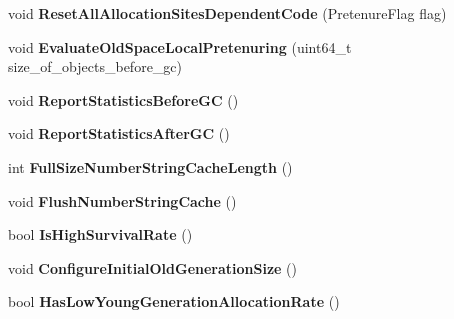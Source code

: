 \begin{DoxyCompactItemize}
\item 
void {\bfseries Reset\+All\+Allocation\+Sites\+Dependent\+Code} (Pretenure\+Flag flag)\hypertarget{classv8_1_1internal_1_1_heap_a4c888518ecaf4fd10400b80140e54769}{}\label{classv8_1_1internal_1_1_heap_a4c888518ecaf4fd10400b80140e54769}

\item 
void {\bfseries Evaluate\+Old\+Space\+Local\+Pretenuring} (uint64\+\_\+t size\+\_\+of\+\_\+objects\+\_\+before\+\_\+gc)\hypertarget{classv8_1_1internal_1_1_heap_adc9aa903226a416ab0e9512ead932b6d}{}\label{classv8_1_1internal_1_1_heap_adc9aa903226a416ab0e9512ead932b6d}

\item 
void {\bfseries Report\+Statistics\+Before\+GC} ()\hypertarget{classv8_1_1internal_1_1_heap_aea3d5c120590d25aa2029789502cb721}{}\label{classv8_1_1internal_1_1_heap_aea3d5c120590d25aa2029789502cb721}

\item 
void {\bfseries Report\+Statistics\+After\+GC} ()\hypertarget{classv8_1_1internal_1_1_heap_a58f5e3a53a3cfc6fe1b56263eda77f15}{}\label{classv8_1_1internal_1_1_heap_a58f5e3a53a3cfc6fe1b56263eda77f15}

\item 
int {\bfseries Full\+Size\+Number\+String\+Cache\+Length} ()\hypertarget{classv8_1_1internal_1_1_heap_a7c6e2dc786c1c3b4ef58139a83397bea}{}\label{classv8_1_1internal_1_1_heap_a7c6e2dc786c1c3b4ef58139a83397bea}

\item 
void {\bfseries Flush\+Number\+String\+Cache} ()\hypertarget{classv8_1_1internal_1_1_heap_ab10da2da4b8b6aea00c262737c3c7804}{}\label{classv8_1_1internal_1_1_heap_ab10da2da4b8b6aea00c262737c3c7804}

\item 
bool {\bfseries Is\+High\+Survival\+Rate} ()\hypertarget{classv8_1_1internal_1_1_heap_a79e5d45c90151997eb0024dce625bc96}{}\label{classv8_1_1internal_1_1_heap_a79e5d45c90151997eb0024dce625bc96}

\item 
void {\bfseries Configure\+Initial\+Old\+Generation\+Size} ()\hypertarget{classv8_1_1internal_1_1_heap_a5c9e28497c11e4f2769c68184a92f965}{}\label{classv8_1_1internal_1_1_heap_a5c9e28497c11e4f2769c68184a92f965}

\item 
bool {\bfseries Has\+Low\+Young\+Generation\+Allocation\+Rate} ()\hypertarget{classv8_1_1internal_1_1_heap_a6d0a8f8d58ed4e9f889dda32dfaebeb3}{}\label{classv8_1_1internal_1_1_heap_a6d0a8f8d58ed4e9f889dda32dfaebeb3}


\end{DoxyCompactItemize}
